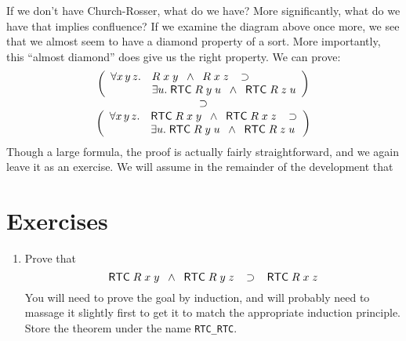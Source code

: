 \documentclass[12pt]{article}
\begin{document}
If we don't have Church-Rosser, what do we have?  More significantly,
what do we have that implies confluence?  If we examine the diagram
above once more, we see that we almost seem to have a diamond property
of a sort.  More importantly, this ``almost diamond'' does give us the
right property.  We can prove:\[
\begin{array}{c}
  \left(
    \begin{array}{ll}
      \forall x\,y\,z. &
      R\;x\;y\;\;\land\;\; R\;x\;z \;\;\;\supset\\
      & \exists u.\;{\sf RTC}\;R\;y\;u \;\;\land\;\;{\sf RTC}\;R\;z\;u
      \end{array}\right)\\
    \supset\\
    \left(
      \begin{array}{ll}
        \forall x\,y\,z. &
        {\sf RTC}\;R\;x\;y\;\;\land\;\;{\sf RTC}\;R\;x\;z
        \;\;\;\supset\\
        & \exists u.\;{\sf RTC}\;R\;y\;u
        \;\;\land\;\;{\sf RTC}\;R\;z\;u
      \end{array}
    \right)
  \end{array}
  \]
Though a large formula, the proof is actually fairly straightforward,
and we again leave it as an exercise.  We will assume in the remainder
of the development that

\section{Exercises}
\label{sec:Exercises}

\begin{enumerate}
\item Prove that \[{\sf RTC}\;R \;x\; y \;\;\land \;\;
  {\sf RTC}\;R\;y\;z\;\;\;\supset\;\;\; {\sf RTC}\;R\;x\;z
\] You will need to prove the goal by induction, and will probably
  need to massage it slightly first to get it to match the appropriate
  induction principle.  Store the theorem under the name
  \texttt{RTC\_RTC}.
\end{enumerate}
\end{document}
